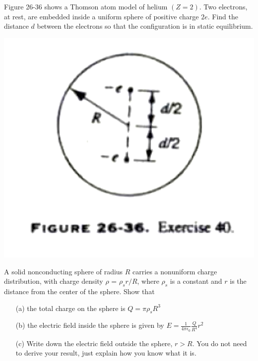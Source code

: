 \documentclass[11pt,letterpaper,boxed]{hmcpset}
\begin{document}
	\begin{problem}[HRK E26.40]
		Figure 26-36 shows a Thomson atom model of helium $(Z = 2)$. Two electrons, at rest, are embedded inside a uniform sphere of positive charge $2e$. Find the distance $d$ between the electrons so that the configuration is in static equilibrium.
		
		\begin{center}
			\includegraphics[scale=0.55]{26-36.png}
		\end{center}
		
	\end{problem}
	
	\begin{solution}
		\vfill
	\end{solution}
	\newpage
	
	\begin{problem}[HRK P27.17]
		A solid nonconducting sphere of radius $R$ carries a nonuniform charge distribution, with charge density $\rho$ = $\rho_s r/R$, where $\rho_s$ is a constant and $r$ is the distance from the center of the sphere. Show that
		\begin{enumerate}
			\item[(a)]the total charge on the sphere is $Q = \pi\rho_s R^3$
			\item[(b)]the electric field inside the sphere is given by $E = \frac{1}{4\pi\epsilon_0}\frac{Q}{R^4}  r^2$
			\item[(c)]Write down the electric field outside the sphere, $r > R$. You do not need to derive your result, just explain how you know what it is.
		\end{enumerate}
		
		
	\end{problem}
	
\end{document}
